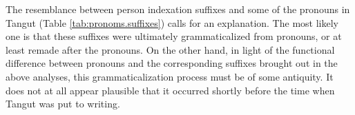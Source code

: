 \documentclass[oldfontcommands,oneside,a4paper,11pt]{article}
\newcommand{\ipa}[1]{{\phon \mbox{#1}}} %
\begin{document}
The resemblance between person indexation suffixes and some of the pronouns in Tangut (Table \ref{tab:pronoms.suffixes}) calls for an explanation. The most likely one is that these suffixes were ultimately grammaticalized from pronouns, or at least remade after the pronouns. On the other hand, in light of the functional difference between pronouns and the corresponding suffixes brought out in the above analyses, this grammaticalization process must be of some antiquity. It does not at all appear plausible that it occurred shortly before the time when Tangut was put to writing.

%
%
%
\end{document}
